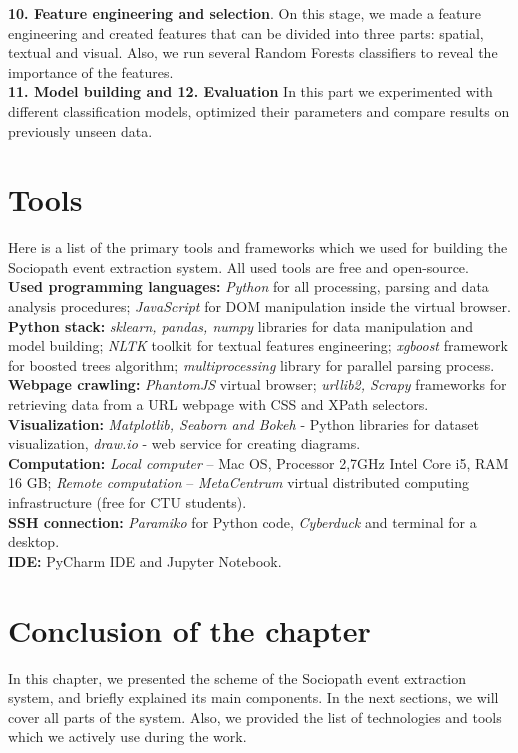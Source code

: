 \textbf{10. Feature engineering and selection}. On this stage, we made a feature engineering and created features that can be divided into three parts: spatial, textual and visual. Also, we run several Random Forests classifiers to reveal the importance of the features.\\

\textbf{11. Model building and 12. Evaluation} In this part we experimented with different classification models, optimized their parameters and compare results on previously unseen data. \\

\section{Tools}

Here is a list of the primary tools and frameworks which we used for building the Sociopath event extraction system. All used tools are free and open-source.\\

\noindent\textbf{Used programming languages:} \textit{Python} for all processing, parsing and data analysis procedures; \textit{JavaScript} for DOM manipulation inside the virtual browser.\\

\noindent\textbf{Python stack:} \textit{sklearn, pandas, numpy} libraries for data manipulation and model building; \textit{NLTK} toolkit for textual features engineering;  \textit{xgboost} framework for boosted trees algorithm; \textit{multiprocessing} library for parallel parsing process. \\

\noindent\textbf{Webpage crawling:} \textit{PhantomJS} virtual browser; \textit{urllib2, Scrapy} frameworks for retrieving data from a URL webpage with CSS and XPath selectors.\\

\noindent\textbf{Visualization:} \textit{Matplotlib, Seaborn and Bokeh} - Python libraries for dataset visualization, \textit{draw.io} - web service for creating diagrams. \\

\noindent\textbf{Computation:} \textit{Local computer} -- Mac OS, Processor 2,7GHz Intel Core i5, RAM 16 GB; \textit{Remote computation} -- \textit{MetaCentrum} virtual distributed computing infrastructure (free for CTU students).\\

\noindent\textbf{SSH connection:} \textit{Paramiko} for Python code, \textit{Cyberduck} and terminal for a desktop.\\

\noindent\textbf{IDE:} PyCharm IDE and Jupyter Notebook.\\

\section*{Conclusion of the chapter}
In this chapter, we presented the scheme of the Sociopath event extraction system, and briefly explained its main components. In the next sections, we will cover all parts of the system. Also, we provided the list of technologies and tools which we actively use during the work. 